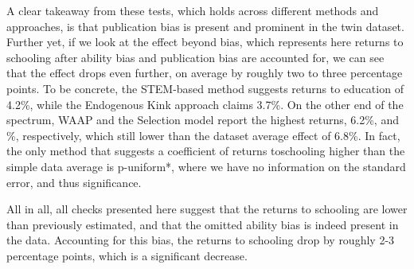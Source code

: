 A clear takeaway from these tests, which holds across different methods and approaches, is that publication bias is present and prominent in the twin dataset. Further yet, if we look at the effect beyond bias, which represents here returns to schooling after ability bias and publication bias are accounted for, we can see that the effect drops even further, on average by roughly two to three percentage points. To be concrete, the STEM-based method suggests returns to education of 4.2\%, while the Endogenous Kink approach claims 3.7\%. On the other end of the spectrum, \ac{WAAP} and the Selection model report the highest returns, 6.2\%, and \%, respectively, which still lower than the dataset average effect of 6.8\%. In fact, the only method that suggests a coefficient of returns toschooling higher than the simple data average is p-uniform*, where we have no information on the standard error, and thus significance.

All in all, all checks presented here suggest that the returns to schooling are lower than previously estimated, and that the omitted ability bias is indeed present in the data. Accounting for this bias, the returns to schooling drop by roughly 2-3 percentage points, which is a significant decrease.